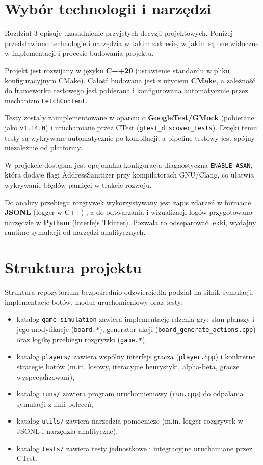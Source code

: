 \documentclass[polish,inz,longabstract]{iithesis}
\begin{document}
\section{Wybór technologii i narzędzi}

Rozdział 3 opisuje uzasadnienie przyjętych decyzji projektowych. Poniżej przedstawiono technologie i narzędzia w takim zakresie, w jakim są one widoczne w implementacji i procesie budowania projektu.

Projekt jest rozwijany w języku \textbf{C++20} (ustawienie standardu w pliku konfiguracyjnym CMake). Całość budowana jest z użyciem \textbf{CMake}, a zależność do frameworku testowego jest pobierana i konfigurowana automatycznie przez mechanizm \texttt{FetchContent}.

Testy zostały zaimplementowane w oparciu o \textbf{GoogleTest/GMock} (pobierane jako \texttt{v1.14.0}) i uruchamiane przez CTest (\texttt{gtest\_discover\_tests}). Dzięki temu testy są wykrywane automatycznie po kompilacji, a pipeline testowy jest spójny niezależnie od platformy.

W projekcie dostępna jest opcjonalna konfiguracja diagnostyczna \texttt{ENABLE\_ASAN}, która dodaje flagi AddressSanitizer przy kompilatorach GNU/Clang, co ułatwia wykrywanie błędów pamięci w trakcie rozwoju.

Do analizy przebiegu rozgrywek wykorzystywany jest zapis zdarzeń w formacie \textbf{JSONL} (logger w C++) \cite{15}, a do odtwarzania i wizualizacji logów przygotowano narzędzie w \textbf{Python} (interfejs Tkinter). Pozwala to odseparować lekki, wydajny runtime symulacji od narzędzi analitycznych.


\section{Struktura projektu}

Struktura repozytorium bezpośrednio odzwierciedla podział na silnik symulacji, implementacje botów, moduł uruchomieniowy oraz testy:

\begin{itemize}
\item katalog \texttt{game\_simulation} zawiera implementację rdzenia gry: stan planszy i jego modyfikacje (\texttt{board.*}), generator akcji (\texttt{board\_generate\_actions.cpp}) oraz logikę przebiegu rozgrywki (\texttt{game.*}),
\item katalog \texttt{players/} zawiera wspólny interfejs gracza (\texttt{player.hpp}) i konkretne strategie botów (m.in. losowy, iteracyjne heurystyki, alpha-beta, gracze wyspecjalizowani),
\item katalog \texttt{runs/} zawiera program uruchomieniowy (\texttt{run.cpp}) do odpalania symulacji z linii poleceń,
\item katalog \texttt{utils/} zawiera narzędzia pomocnicze (m.in. logger rozgrywek w JSONL i narzędzia analityczne),
\item katalog \texttt{tests/} zawiera testy jednostkowe i integracyjne uruchamiane przez CTest.
\end{itemize}
\end{document}
